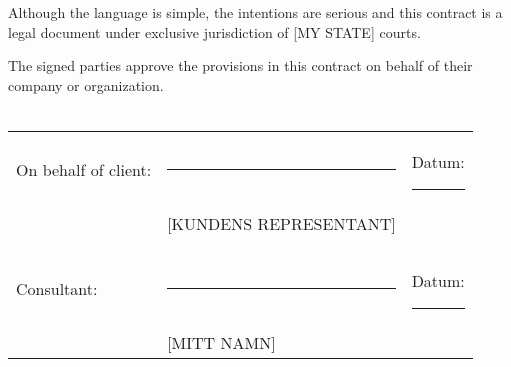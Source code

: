 \documentclass[10pt,a4paper,parskip]{scrartcl}
\begin{document}
Although the language is simple, the intentions are serious and this contract
is a legal document under exclusive jurisdiction of [MY STATE] courts.

\vspace{1cm}

\noindent The signed parties approve the provisions in this contract on behalf of their company or organization.\\\\

\noindent \begin{tabular}{l l l}
On behalf of client:  & \rule{6cm}{.2pt}       & Datum: \rule{2.4cm}{.2pt}\\
                      & [KUNDENS REPRESENTANT] & \\\\\\
Consultant:           & \rule{6cm}{.2pt}       & Datum: \rule{2.4cm}{.2pt}\\
                      & [MITT NAMN]            & \\
\end{tabular}
\end{document}
